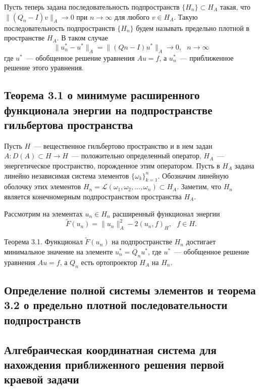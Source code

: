 \documentclass[a4paper,14pt]{article} %
\begin{document}
Пусть теперь задана последовательность подпространств
$\{H_n \} \subset H_A$ такая, что $\|(Q_n − I)v\|_A \to 0$ при
$n \to \infty$ для любого $v \in H_A$.
Такую последовательность подпространств $\{H_n \}$
будем называть предельно плотной в пространстве $H_A$.
В таком случае
\begin{equation}
	\|u^*_n − u^*\|_A = \|(Q n − I)u^* \|_A \to 0,
	~~~
	n\to\infty
\end{equation}
где $u^*$~--- обобщенное решение уравнения $Au = f$,
а $u^*_n$~--- приближенное решение этого уравнения.


\subsection{Теорема 3.1 о минимуме расширенного функционала энергии на подпространстве гильбертова пространства}

Пусть $H$~--- вещественное гильбертово пространство и в нем задан
$A : D(A) \subset H \to H$~--- положительно определенный оператор,
$H_A$~--- энергетическое пространство, порожденное этим оператором.
Пусть в $H_A$ задана линейно независимая система элементов $\{\omega_k\}_{k=1}^n$.
Обозначим линейную оболочку этих элементов $H_n = \mathcal{L}(\omega_1, \omega_2 , ... , \omega_n ) \subset H_A$.
Заметим, что $H_n$ является конечномерным подпространством пространства $H_A$.

Рассмотрим на элементах $u_n \in H_n$ расширенный функционал энергии
\begin{equation}
	\tilde{F}(u_n ) = \|u_n \|^2_A - 2(u_n, f )_H ,
	~~~
	f \in H.
\end{equation}

Теорема 3.1.
Функционал $\tilde{F}(u_n)$ на подпространстве $H_n$ достигает
минимальное значение на элементе $u^*_n = Q_n u^*$,
где $u^*$~--- обобщенное решение уравнения $Au = f$, а $Q_n$ есть ортопроектор $H_A$ на $H_n$.


\subsection{Определение полной системы элементов и теорема 3.2 о предельно плотной последовательности подпространств}

\subsection{Алгебраическая координатная система для нахождения приближенного решения первой краевой задачи}
\end{document}
